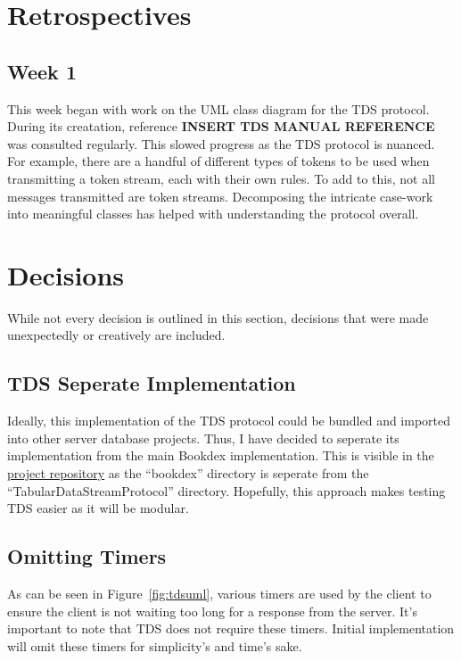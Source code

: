 \documentclass{article}
\newcommand{\repo}[1]{\href{https://github.com/SawyersCoding/bookdex/tree/main}{#1}}
\begin{document}
\section{Retrospectives}\label{sec:retro}
    \subsection{Week 1}\label{sec:retro:week1}
        This week began with work on the UML class diagram for the TDS protocol. During its creatation, reference \textbf{INSERT TDS MANUAL REFERENCE} was consulted regularly. This slowed progress as the TDS protocol is nuanced. For example, there are a handful of different types of tokens to be used when transmitting a token stream, each with their own rules. To add to this, not all messages transmitted are token streams. Decomposing the intricate case-work into meaningful classes has helped with understanding the protocol overall.

\section{Decisions}\label{sec:dec}
    While not every decision is outlined in this section, decisions that were made unexpectedly or creatively are included.

    \subsection{TDS Seperate Implementation}\label{sec:dec:seperatetds}
        Ideally, this implementation of the TDS protocol could be bundled and imported into other server database projects. Thus, I have decided to seperate its implementation from the main Bookdex implementation. This is visible in the \repo{project repository} as the ``bookdex'' directory is seperate from the ``TabularDataStreamProtocol'' directory. Hopefully, this approach makes testing TDS easier as it will be modular.

    \subsection{Omitting Timers}\label{sec:dec:timers}
        As can be seen in Figure~\ref{fig:tdsuml}, various timers are used by the client to ensure the client is not waiting too long for a response from the server. It's important to note that TDS does not require these timers. Initial implementation will omit these timers for simplicity's and time's sake.
\end{document}
